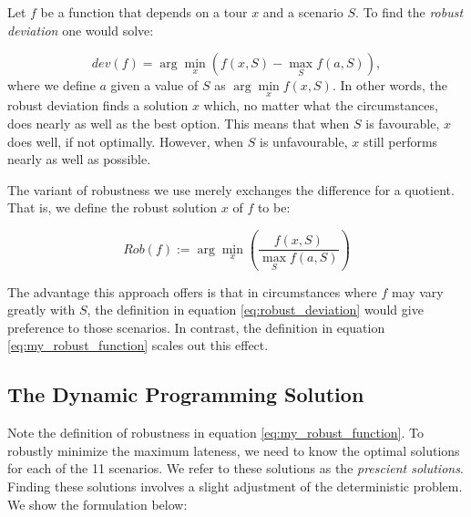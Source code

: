 Let $f$ be a function that depends on a tour $x$ and a scenario $S$. To find the \textit{robust deviation} one would solve:

\begin{equation}
\label{eq:robust_deviation}
dev(f) = \arg\min \limits_x \left( f(x,S) - \max \limits_S f(a, S)\right),
\end{equation}
where we define $a$ given a value of $S$ as $\arg\min \limits_x f(x,S)$. In other words, the robust deviation finds a solution $x$ which, no matter what the circumstances, does nearly as well as the best option. This means that when $S$ is favourable, $x$ does well, if not optimally. However, when $S$ is unfavourable, $x$ still performs nearly as well as possible.

The variant of robustness we use merely exchanges the difference for a quotient. That is, we define the robust solution $x$ of $f$ to be:

\begin{equation}
\label{eq:my_robust_function}
Rob(f) := \arg\min\limits_x \left(\frac{f(x,S)}{\max \limits_S f(a,S)} \right)
\end{equation}

The advantage this approach offers is that in circumstances where $f$ may vary greatly with $S$, the definition in equation \ref{eq:robust_deviation} would give preference to those scenarios. In contrast, the definition in equation \ref{eq:my_robust_function} scales out this effect.



\subsection{The Dynamic Programming Solution}
Note the definition of robustness in equation \ref{eq:my_robust_function}. To robustly minimize the maximum lateness, we need to know the optimal solutions for each of the 11 scenarios. We refer to these solutions as the \textit{prescient solutions}. Finding these solutions involves a slight adjustment of the deterministic problem. We show the formulation below:

